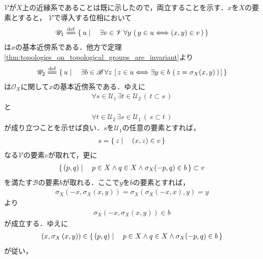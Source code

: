 	\begin{sketch}
		$\mathscr{V}$が$X$上の近縁系であることは既に示したので，両立することを示す．$x$を$X$の要素とすると，
		$\mathscr{V}$で導入する位相において
		\begin{align}
			\mathscr{U}_1 \defeq
			\Set{u}{\exists v \in \mathscr{V}\, \forall y\, \left(\, y \in u \Longleftrightarrow (x,y) \in v\, \right)}
		\end{align}
		は$x$の基本近傍系である．他方で定理\ref{thm:topologies_on_topological_groups_are_invariant}より
		\begin{align}
			\mathscr{U}_2 \defeq
			\Set{u}{\exists b \in \mathscr{B}\, 
			\forall z\, \left[\, z \in u \Longleftrightarrow \exists y \in b\, \left(\, z=\sigma_X(x,y)\, \right) \, \right]}
		\end{align}
		は$\mathscr{O}_X$に関して$x$の基本近傍系である．ゆえに
		\begin{align}
			\forall s \in \mathscr{U}_1\, \exists t \in \mathscr{U}_2\, (\, t \subset s\, )
			\label{fom:thm_topological_groups_are_uniformazable_1}
		\end{align}
		と
		\begin{align}
			\forall t \in \mathscr{U}_2\, \exists s \in \mathscr{U}_1\, (\, s \subset t\, )
			\label{fom:thm_topological_groups_are_uniformazable_2}
		\end{align}
		が成り立つことを示せば良い．$s$を$\mathscr{U}_1$の任意の要素とすれば，
		\begin{align}
			s = \left\{\, z \mid \quad (x,z) \in v\, \right\}
		\end{align}
		なる$\mathscr{V}$の要素$v$が取れて，更に
		\begin{align}
			\left\{\, (p,q) \mid \quad p \in X \wedge q \in X \wedge \sigma_X(-p,q) \in b\, \right\} \subset v
		\end{align}
		を満たす$\mathscr{B}$の要素$b$が取れる．ここで$y$を$b$の要素とすれば，
		\begin{align}
			\sigma_X\left(-x,\sigma_X\left(x,y\right)\right)
			= \sigma_X\left(\sigma_X\left(-x,x\right),y\right)
			= y
		\end{align}
		より
		\begin{align}
			\sigma_X\left(-x,\sigma_X\left(x,y\right)\right) \in b
		\end{align}
		が成立する．ゆえに
		\begin{align}
			\left(x,\sigma_X\left(x,y\right)\right) \in \left\{\, (p,q) \mid \quad p \in X \wedge q \in X \wedge \sigma_X(-p,q) \in b\, \right\}
		\end{align}
		が従い，
		\begin{align}

\end{align}
\end{sketch}

